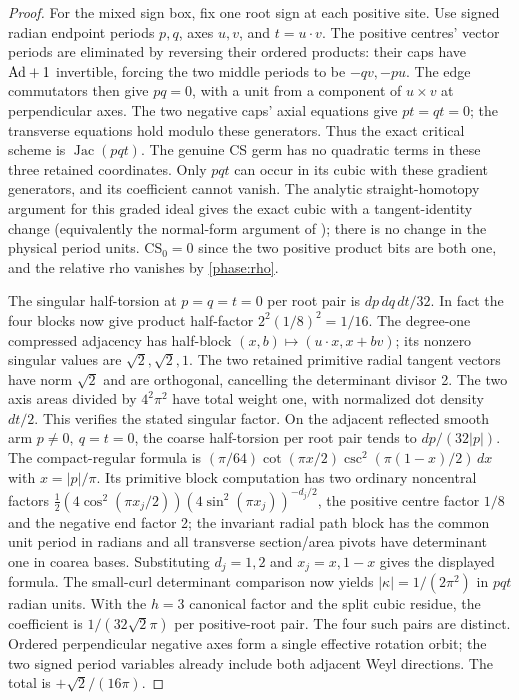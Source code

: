 \begin{proof}
For the mixed sign box, fix one root sign at each positive
site. Use signed radian endpoint periods \(p,q\), axes
\(u,v\), and \(t=u\cdot v\). The positive centres' vector
periods are eliminated by reversing their ordered
products: their caps have \({\rm Ad}+1\) invertible,
forcing the two middle periods to be \(-qv,-pu\).
The edge commutators then give \(pq=0\), with a unit
from a component of \(u\times v\) at perpendicular
axes. The two negative caps' axial equations give
\(pt=qt=0\); the transverse equations hold modulo these
generators. Thus the exact critical scheme is
\(\operatorname{Jac}(pqt)\). The genuine CS germ has no
quadratic terms in these three retained coordinates.
Only \(pqt\) can occur in its cubic with these gradient
generators, and its coefficient cannot vanish.
The analytic straight-homotopy argument for this
graded ideal gives the exact cubic with a
tangent-identity change (equivalently the normal-form
argument of \cite{P49B}); there is no change in the
physical period units. \(\mathrm{CS}_0=0\) since the
two positive product bits are both one, and the
relative rho vanishes by \eqref{phase:rho}.

The singular half-torsion at \(p=q=t=0\) per root pair
is \(dp\,dq\,dt/32\). In fact the four blocks now give
product half-factor \(2^2(1/8)^2=1/16\).
The degree-one compressed adjacency has half-block
\((x,b)\mapsto(u\cdot x,x+bv)\); its nonzero singular
values are \(\sqrt2,\sqrt2,1\).
The two retained primitive radial tangent vectors
have norm \(\sqrt2\) and are orthogonal, cancelling
the determinant divisor 2. The two axis areas
divided by \(4^2\pi^2\) have total weight one,
with normalized dot density \(dt/2\). This verifies
the stated singular factor. On the adjacent reflected
smooth arm \(p\ne0,\ q=t=0\), the coarse half-torsion
per root pair tends to \(dp/(32|p|)\).
The compact-regular formula is
\((\pi/64)\cot(\pi x/2)\csc^2(\pi(1-x)/2)\,dx\)
with \(x=|p|/\pi\). Its primitive block computation
has two ordinary noncentral factors
\(\frac12(4\cos^2(\pi x_j/2))
 (4\sin^2(\pi x_j))^{-d_j/2}\),
the positive centre factor \(1/8\) and the negative
end factor 2; the invariant radial path block has
the common unit period in radians and all
transverse section/area pivots have determinant
one in coarea bases. Substituting \(d_j=1,2\) and
\(x_j=x,1-x\) gives the displayed formula.
The small-curl determinant comparison now yields
\(|\kappa|=1/(2\pi^2)\) in \(pqt\) radian units.
With the \(h=3\) canonical factor and the split
cubic residue, the coefficient is
\(1/(32\sqrt2\pi)\) per positive-root pair. The four
such pairs are distinct. Ordered perpendicular
negative axes form a single effective rotation
orbit; the two signed period variables already
include both adjacent Weyl directions. The total
is \(+\sqrt2/(16\pi)\).


\end{proof}
